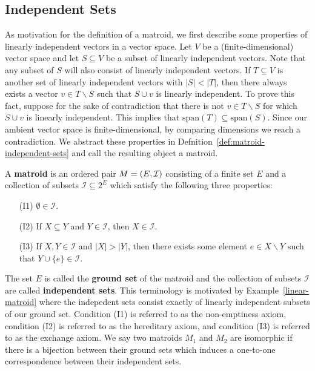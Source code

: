 \documentclass{puthesis-UG}
\begin{document}
\subsection{Independent Sets} \label{sec:independent-sets}

As motivation for the definition of a matroid, we first describe some properties of linearly independent vectors in a vector space. Let $V$ be a (finite-dimensional) vector space and let $S \subseteq V$ be a subset of linearly independent vectors. Note that any subset of $S$ will also consist of linearly independent vectors. If $T \subseteq V$ is another set of linearly independent vectors with $|S| < |T|$, then there always exists a vector $v \in T \backslash S$ such that $S \cup v$ is linearly independent. To prove this fact, suppose for the sake of contradiction that there is not $v \in T \backslash S$ for which $S \cup v$ is linearly independent. This implies that $\text{span} (T) \subseteq \text{span} (S)$. Since our ambient vector space is finite-dimensional, by comparing dimensions we reach a contradiction. We abstract these properties in Defnition~\ref{def:matroid-independent-sets} and call the resulting object a matroid.

\begin{defn} \label{def:matroid-independent-sets}
	A \textbf{matroid} is an ordered pair $M = (E, \mathcal{I})$ consisting of a finite set $E$ and a collection of subsets $\mathcal{I} \subseteq 2^E$ which satisfy the following three properties:
	\begin{enumerate}
		\item[(I1)] $\emptyset \in \mathcal{I}$.
		\item[(I2)] If $X \subseteq Y$ and $Y \in \mathcal{I}$, then $X \in \mathcal{I}$.
		\item[(I3)] If $X, Y \in \mathcal{I}$ and $|X| > |Y|$, then there exists some element $e \in X \backslash Y$ such that $Y \cup \{e\} \in \mathcal{I}$.
	\end{enumerate}
\end{defn}

The set $E$ is called the \textbf{ground set} of the matroid and the collection of subsets $\mathcal{I}$ are called \textbf{independent sets}. This terminology is motivated by Example~\ref{linear-matroid} where the indepedent sets consist exactly of linearly independent subsets of our ground set. Condition (I1) is referred to as the non-emptiness axiom, condition (I2) is referred to as the hereditary axiom, and condition (I3) is referred to as the exchange axiom. We say two matroids $M_1$ and $M_2$ are isomorphic if there is a bijection between their ground sets which induces a one-to-one correspondence between their independent sets. 
\end{document}
